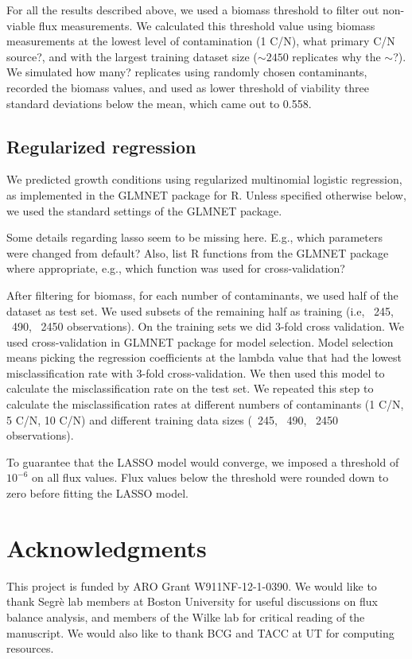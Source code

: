 \documentclass[12pt]{article}
\begin{document}
For all the results described above, we used a biomass threshold to filter out non-viable flux measurements. We calculated this threshold value using biomass measurements at the lowest level of contamination (1 C/N), {\color{red}what primary C/N source?}, and with the largest training dataset size ($\sim2450$ replicates {\color{red}why the $\sim$?}). We simulated {\color{red}how many?} replicates using randomly chosen contaminants, recorded the biomass values, and used as lower threshold of viability three standard deviations below the mean, which came out to 0.558.

\subsection*{Regularized regression}

We predicted growth conditions using regularized multinomial logistic regression, as implemented in the GLMNET package \cite{Friedmanetal2010} for R. Unless specified otherwise below, we used the standard settings of the GLMNET package.

{\color{red}Some details regarding lasso seem to be missing here. E.g., which parameters were changed from default? Also, list R functions from the GLMNET package where appropriate, e.g., which function was used for cross-validation?}

After filtering for biomass, for each number of contaminants, we used half of the dataset as test set. We used subsets of the remaining half as training (i.e, ~245, ~490, ~2450 observations). On the training sets we did 3-fold cross validation. We used cross-validation in GLMNET package for model selection. Model selection means picking the regression coefficients at the lambda value that had the lowest misclassification rate with 3-fold cross-validation. We then used this model to calculate the misclassification rate on the test set. We repeated this step to calculate the misclassification rates at different numbers of contaminants (1 C/N, 5 C/N, 10 C/N) and different training data sizes (~245, ~490, ~2450 observations).

To guarantee that the LASSO model would converge, we imposed a threshold of $10^{-6}$ on all flux values. Flux values below the threshold were rounded down to zero before fitting the LASSO model.

\section*{Acknowledgments}
This project is funded by ARO Grant W911NF-12-1-0390. We would like to thank Segr\`e lab members at Boston University for useful discussions on flux balance analysis, and members of the Wilke lab for critical reading of the manuscript. We would also like to thank BCG and TACC at UT for computing resources. 
\end{document}
